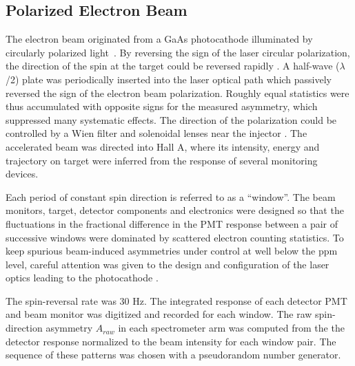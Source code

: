 
\subsection{Polarized Electron Beam}\label{sec:app_electronbeam}

The electron beam originated from a GaAs photocathode illuminated by 
circularly polarized light~\cite{Sinclair2007}.
By reversing the sign of the laser circular 
polarization, the direction of the spin at the target could be 
reversed rapidly \cite{Paschke:2007zz}.
A half-wave ($\lambda$/2) plate was periodically inserted into the 
laser optical path which passively reversed the
sign of the electron beam polarization. 
Roughly equal statistics were thus 
accumulated with opposite signs for the measured asymmetry, which suppressed 
many systematic effects.  
The direction of the polarization could be
controlled by a Wien filter and solenoidal lenses
near the injector \cite{GramesWien2011}.  The accelerated beam was 
directed into Hall A, where its intensity, energy and trajectory on 
target were inferred from the response of several monitoring devices.

Each period of constant spin direction is referred to as a ``window''.
The beam monitors, target, detector components and 
electronics were designed so that
the fluctuations in the fractional difference in the PMT response between
a pair of successive windows were
dominated by scattered electron counting statistics.
To keep spurious beam-induced asymmetries under
 control at well below the ppm level, 
careful attention was given to the design and configuration of the laser 
optics leading to the photocathode \cite{Paschke:2007zz}.

The spin-reversal rate was 30 Hz.
The integrated response of each detector PMT and beam monitor
was digitized and recorded for each window.
The raw spin-direction asymmetry $A_{raw}$
in each spectrometer arm was computed from the the detector response
normalized to the beam intensity 
for each window pair. 
The sequence of these
patterns was chosen with a pseudorandom number generator.

